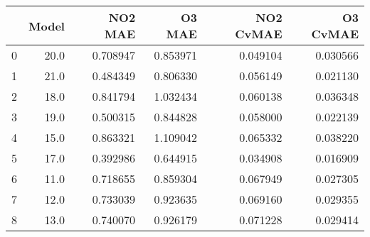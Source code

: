 \begin{tabular}{lrrrrr}
\toprule
{} &  Model &   NO2 MAE &    O3 MAE &  NO2 CvMAE &  O3 CvMAE \\
\midrule
0 &   20.0 &  0.708947 &  0.853971 &   0.049104 &  0.030566 \\
1 &   21.0 &  0.484349 &  0.806330 &   0.056149 &  0.021130 \\
2 &   18.0 &  0.841794 &  1.032434 &   0.060138 &  0.036348 \\
3 &   19.0 &  0.500315 &  0.844828 &   0.058000 &  0.022139 \\
4 &   15.0 &  0.863321 &  1.109042 &   0.065332 &  0.038220 \\
5 &   17.0 &  0.392986 &  0.644915 &   0.034908 &  0.016909 \\
6 &   11.0 &  0.718655 &  0.859304 &   0.067949 &  0.027305 \\
7 &   12.0 &  0.733039 &  0.923635 &   0.069160 &  0.029355 \\
8 &   13.0 &  0.740070 &  0.926179 &   0.071228 &  0.029414 \\
\bottomrule
\end{tabular}
